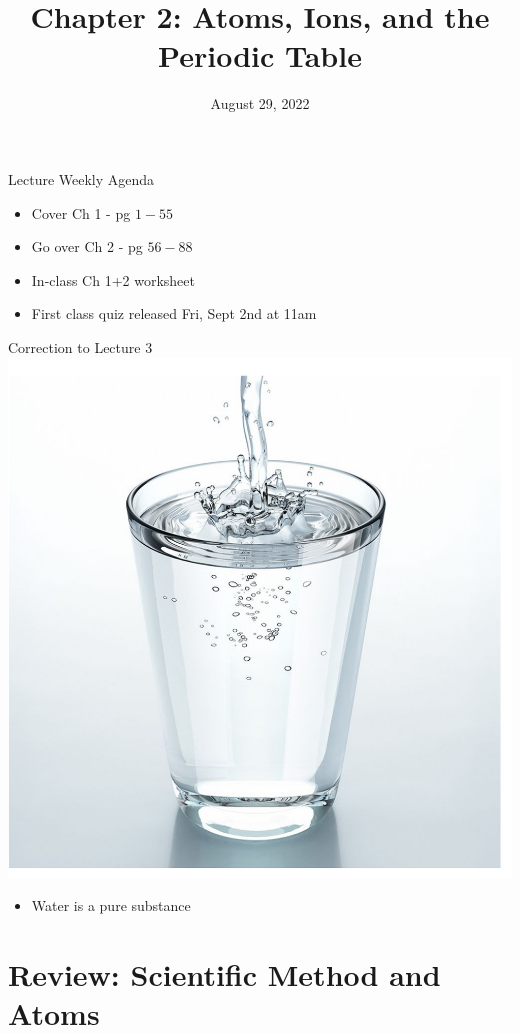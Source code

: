 \documentclass[11pt]{beamer}
\title{Chapter 2: Atoms, Ions, and the Periodic Table}
\institute{Chemistry Department, Cypress College}
\date{August 29, 2022}
\begin{document}
\begin{frame}
  \titlepage
\end{frame}

\begin{frame}{Lecture Weekly Agenda}
  \begin{itemize}
  \item Cover Ch 1 - pg $1 - 55$
  \item Go over Ch 2 - pg $56 - 88$
  \item In-class Ch 1+2 worksheet
  \item First class quiz released Fri, Sept 2nd at 11am
  \end{itemize}
\end{frame}

\begin{frame}{Correction to Lecture 3}
  \centering
  \includegraphics[scale=0.15]{water}

  \begin{itemize}
  \item Water is a pure substance
  \end{itemize}
\end{frame}

\section{Review: Scientific Method and Atoms}
\end{document}
